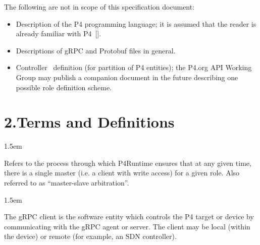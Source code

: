 \documentclass[11pt]{article}
\begin{document}
{%
\noindent{}The following are not in scope of this specification document:%

\begin{itemize}[noitemsep,topsep=\mdcompacttopsep]%

\item{}Description of the P4 programming language; it is assumed that the reader is
already familiar with P4~[].%

\item{}Descriptions of gRPC and Protobuf files in general.%

\item{}Controller~ definition (for partition of
P4 entities); the P4.org API Working Group may publish a companion document in
the future describing one possible role definition scheme.%
\end{itemize}%

\section{2.\hspace*{0.5em}Terms and Definitions}\label{sec-terms-and-definitions}%

\begin{mddefinitions}%


\begin{mdbmarginx}{}{}{}{1.5em}%
\begin{mddefdata}%
Refers to the process through which P4Runtime ensures that at any given
time, there is a single master (i.e. a client with write access) for a given
role. Also referred to as \textquotedblleft{}master-slave arbitration\textquotedblright{}.
\end{mddefdata}%
\end{mdbmarginx}%


\begin{mdbmarginx}{}{}{}{1.5em}%
\begin{mddefdata}%
The gRPC client is the software entity which controls the P4 target or
device by communicating with the gRPC agent or server. The client may be
local (within the device) or remote (for example, an SDN controller).
\end{mddefdata}%
\end{mdbmarginx}%


\end{mddefinitions}}
\end{document}
